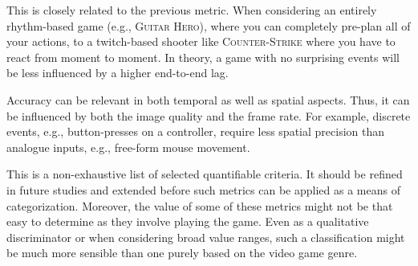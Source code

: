  This is closely related to the previous metric. When considering an entirely rhythm-based game (e.g., \textsc{Guitar Hero}), where you can completely pre-plan all of your actions, to a twitch-based shooter like \textsc{Counter-Strike} where you have to react from moment to moment. In theory, a game with no surprising events will be less influenced by a higher end-to-end lag.

 Accuracy can be relevant in both temporal as well as spatial aspects.
    Thus, it can be influenced by both the image quality and the frame rate.
    For example, discrete events, e.g., button-presses on a controller, require less spatial precision than analogue inputs, e.g., free-form mouse movement.


This is a non-exhaustive list of selected quantifiable criteria.
It should be refined in future studies and extended before such metrics can be applied as a means of categorization.
Moreover, the value of some of these metrics might not be that easy to determine as they involve playing the game. Even as a qualitative discriminator or when considering broad value ranges, such a classification might be much more sensible than one purely based on the video game genre.